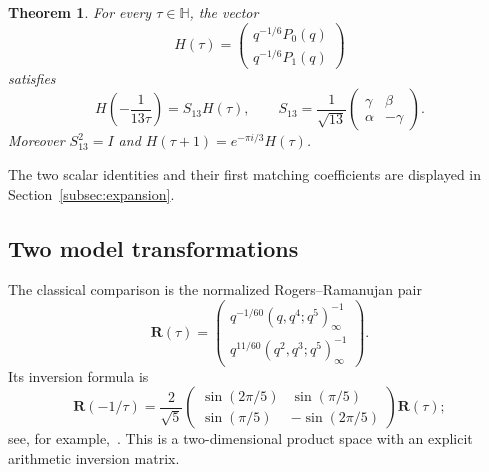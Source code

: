 \documentclass[11pt]{amsart}
\newtheorem{theorem}{Theorem}[section]
\theoremstyle{remark}
\newcommand{\HH}{\mathbb H}
\begin{document}
\begin{theorem}\label{thm:main}
For every $\tau\in\HH$, the vector
\[
 H(\tau)=\begin{pmatrix}q^{-1/6}P_0(q)\\q^{-1/6}P_1(q)\end{pmatrix}
\]
satisfies
\begin{equation}\label{eq:main}
 H\left(-\frac1{13\tau}\right)=S_{13}H(\tau),\qquad
 S_{13}=\frac1{\sqrt{13}}\begin{pmatrix}\gamma&\beta\\\alpha&-\gamma\end{pmatrix}.
\end{equation}
Moreover $S_{13}^2=I$ and $H(\tau+1)=e^{-\pi i/3}H(\tau)$.
\end{theorem}

The two scalar identities and their first matching coefficients are displayed
in Section~\ref{subsec:expansion}.

\subsection{Two model transformations}
The classical comparison is the normalized Rogers--Ramanujan pair
\[
 \mathbf R(\tau)=
 \begin{pmatrix}
 q^{-1/60}(q,q^4;q^5)_\infty^{-1}\\
 q^{11/60}(q^2,q^3;q^5)_\infty^{-1}
 \end{pmatrix}.
\]
Its inversion formula is
\begin{equation}\label{eq:RR-context}
 \mathbf R(-1/\tau)=\frac2{\sqrt5}
 \begin{pmatrix}
 \sin(2\pi/5)&\sin(\pi/5)\\
 \sin(\pi/5)&-\sin(2\pi/5)
 \end{pmatrix}\mathbf R(\tau);
\end{equation}
see, for example,~\cite[Theorem 1]{Ono}. This is a two-dimensional product
space with an explicit arithmetic inversion matrix.
\end{document}

